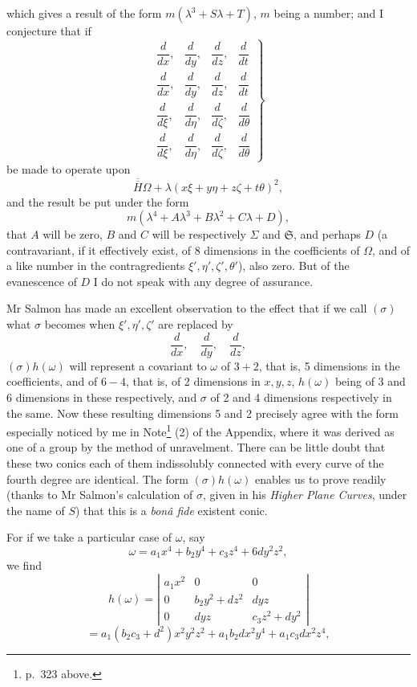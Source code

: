 \documentclass[11pt]{article}
\newcommand{\sourcepage}[1]{\marginpar{\scriptsize p.~#1}}
\begin{document}
{{\sourcepage{332}
which gives a result of the form $m(\lambda^3+S\lambda+T)$, $m$ being a number; and I conjecture that if
\[
\left.
\begin{matrix}
\dfrac{d}{dx},&\dfrac{d}{dy},&\dfrac{d}{dz},&\dfrac{d}{dt}\\
\dfrac{d}{dx},&\dfrac{d}{dy},&\dfrac{d}{dz},&\dfrac{d}{dt}\\
\dfrac{d}{d\xi},&\dfrac{d}{d\eta},&\dfrac{d}{d\zeta},&\dfrac{d}{d\theta}\\
\dfrac{d}{d\xi},&\dfrac{d}{d\eta},&\dfrac{d}{d\zeta},&\dfrac{d}{d\theta}
\end{matrix}
\right\}
\]
be made to operate upon
\[
\overline{\overline H}\Omega+\lambda(x\xi+y\eta+z\zeta+t\theta)^2,
\]
and the result be put under the form
\[
m(\lambda^4+A\lambda^3+B\lambda^2+C\lambda+D),
\]
that $A$ will be zero, $B$ and $C$ will be respectively $\Sigma$ and $\mathfrak{S}$, and perhaps $D$ (a contravariant, if it effectively exist, of 8 dimensions in the coefficients of $\Omega$, and of a like number in the contragredients $\xi',\eta',\zeta',\theta'$), also zero. But of the evanescence of $D$ I do not speak with any degree of assurance.

Mr Salmon has made an excellent observation to the effect that if we call $(\sigma)$ what $\sigma$ becomes when $\xi',\eta',\zeta'$ are replaced by
\[
\frac{d}{dx},\quad \frac{d}{dy},\quad \frac{d}{dz},
\]
$(\sigma)h(\omega)$ will represent a covariant to $\omega$ of $3+2$, that is, 5 dimensions in the coefficients, and of $6-4$, that is, of 2 dimensions in $x,y,z$, $h(\omega)$ being of 3 and 6 dimensions in these respectively, and $\sigma$ of 2 and 4 dimensions respectively in the same. Now these resulting dimensions 5 and 2 precisely agree with the form especially noticed by me in Note\footnote{p.~323 above.} (2) of the Appendix, where it was derived as one of a group by the method of unravelment. There can be little doubt that these two conics each of them indissolubly connected with every curve of the fourth degree are identical. The form $(\sigma)h(\omega)$ enables us to prove readily (thanks to Mr Salmon's calculation of $\sigma$, given in his \emph{Higher Plane Curves}, under the name of $S$) that this is a \emph{bonâ fide} existent conic.

For if we take a particular case of $\omega$, say
\[
\omega=a_1x^4+b_2y^4+c_3z^4+6dy^2z^2,
\]
we find
\[
h(\omega)=
\left|\begin{array}{ccc}
a_1x^2&0&0\\
0&b_2y^2+dz^2&dyz\\
0&dyz&c_3z^2+dy^2
\end{array}\right|
\]
\[
=a_1(b_2c_3+d^2)x^2y^2z^2+a_1b_2dx^2y^4+a_1c_3dx^2z^4,
\]

}}
\end{document}
